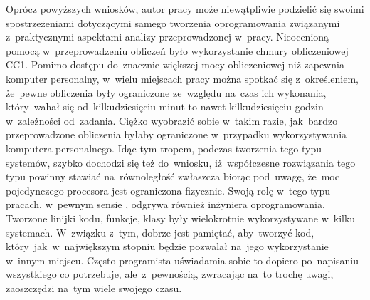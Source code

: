 Oprócz powyższych wniosków, autor pracy może niewątpliwie podzielić się swoimi spostrzeżeniami dotyczącymi samego tworzenia oprogramowania związanymi z~praktycznymi aspektami analizy przeprowadzonej w~pracy. Nieocenioną pomocą w~przeprowadzeniu obliczeń było wykorzystanie chmury obliczeniowej CC1. Pomimo dostępu do~znacznie większej mocy obliczeniowej niż zapewnia komputer personalny, w~wielu miejscach pracy można spotkać się z~określeniem, że~pewne obliczenia były ograniczone ze~względu na~czas ich wykonania, który~wahał się od~kilkudziesięciu minut to nawet kilkudziesięciu godzin w~zależności od~zadania. Ciężko wyobrazić sobie w~takim razie, jak~bardzo przeprowadzone obliczenia byłaby ograniczone w~przypadku wykorzystywania komputera personalnego. Idąc tym tropem, podczas tworzenia tego typu systemów, szybko dochodzi się też do~wniosku, iż~współczesne rozwiązania tego typu powinny stawiać na~równoległość zwłaszcza biorąc pod~uwagę, że~moc pojedynczego procesora jest ograniczona fizycznie. Swoją rolę w~tego typu pracach, w~pewnym sensie , odgrywa również inżyniera oprogramowania. Tworzone linijki kodu, funkcje, klasy były wielokrotnie wykorzystywane w~kilku systemach. W~związku z~tym, dobrze jest pamiętać, aby~tworzyć kod, który~jak~w~największym stopniu będzie pozwalał na~jego wykorzystanie w~innym miejscu. Często programista uświadamia sobie to dopiero po~napisaniu wszystkiego co potrzebuje, ale~z~pewnością, zwracając na~to trochę uwagi, zaoszczędzi na~tym wiele swojego czasu.
